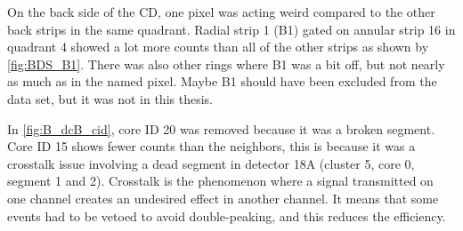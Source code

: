 \documentclass[twoside,english]{uiofysmaster/uiofysmaster}
\newcommand{\Sm}{$^{140}$Sm} %
\newcommand{\Pb}{$^{208}$Pb}
\let\orgautoref\autoref
\renewcommand{\autoref}
        {%
		 \def\sectionautorefname{Section}%
		 \def\subsectionautorefname{Section}%
		 \def\subsubsectionautorefname{Section}%
		 \def\chapterautorefname{Chapter}%
          \orgautoref}
\begin{document}
On the back side of the CD, one pixel was acting weird compared to the other back strips in the same quadrant. 
Radial strip 1 (B1) gated on annular strip 16 in quadrant 4 showed a lot more counts than all of the other strips as shown by \autoref{fig:BDS_B1}. 
There was also other rings where B1 was a bit off, but not nearly as much as in the named pixel. 
Maybe B1 should have been excluded from the data set, but it was not in this thesis.

In \autoref{fig:B_dcB_cid}, core ID 20 was removed because it was a broken segment. 
Core ID 15 shows fewer counts than the neighbors, this is because it was a crosstalk issue involving a dead segment in detector 18A (cluster 5, core 0, segment 1 and 2). 
Crosstalk is the phenomenon where a signal transmitted on one channel creates an undesired effect in another channel. 
It means that some events had to be vetoed to avoid double-peaking, and this reduces the efficiency.




\end{document}

